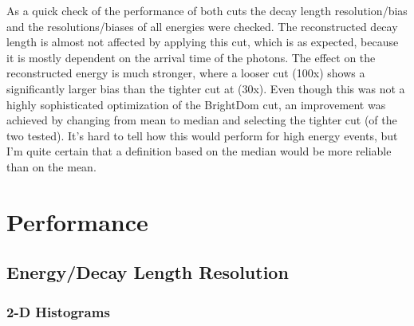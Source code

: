 As a quick check of the performance of both cuts the decay length resolution/bias and the resolutions/biases of all energies were checked. The reconstructed decay length is almost not affected by applying this cut, which is as expected, because it is mostly dependent on the arrival time of the photons. The effect on the reconstructed energy is much stronger, where a looser cut (100x) shows a significantly larger bias than the tighter cut at (30x). Even though this was not a highly sophisticated optimization of the BrightDom cut, an improvement was achieved by changing from mean to median and selecting the tighter cut (of the two tested). It's hard to tell how this would perform for high energy events, but I'm quite certain that a definition based on the median would be more reliable than on the mean.


\section{Performance}

\subsection{Energy/Decay Length Resolution}


\subsubsection{2-D Histograms}

